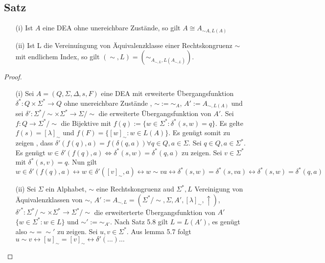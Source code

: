\subsection{Satz}
\begin{itemize}
  \item [(i)] Ist $A$ eine DEA ohne unereichbare Zustände, so gilt $A \cong A_{\sim A, L(A)}$
  \item [(ii)] Ist L die Vereinuíngung von Äquivalenzklasse einer Rechtskongruenz $\sim$ mit endlichem Index, so gilt $(\sim, L) = (\sim_{A_{\sim, L}, L(A_{\sim, L})})$.
\end{itemize}

\begin{proof}
  \begin{itemize}
    \item [(i)] Sei $A = (Q, \Sigma, \Delta, s, F)$ eine DEA mit erweiterte Übergangsfunktion $\delta^* : Q \times \Sigma^* \to Q$ ohne unereichbare Zustände , $\sim := \sim_A$, $A' := A_{\sim, L(A)}$ und sei $\delta' : \Sigma^* / \sim \times \Sigma^* \to \Sigma/\sim$ die erweiterte Übergangsfunktion von $A'$. Sei $f : Q \to \Sigma^* / \sim$ die Bijektive mit $f(q) := \{ w \in \Sigma^* : \delta^*(s,w) = q\}$. Es gelte $f(s) = [\lambda]_{\sim}$ und $f(F) = \{[w]_{\sim} : w \in L(A)\}$. Es genügt somit zu zeigen , dass $\delta'(f(q), a) = f(\delta(q,a)) \forall q \in Q, a \in \Sigma$. Sei $q \in Q, a \in \Sigma^*$. Es genügt $w \in \delta' (f(q), a) \Leftrightarrow \delta^*(s,w) = \delta^*(q, a)$ zu zeigen. Sei $v \in \Sigma^*$ mit $\delta^*(s,v) = q$. Nun gilt $w \in \delta'(f(q), a) \leftrightarrow w \in \delta'([v]_{\sim}, a) \leftrightarrow w \sim va \leftrightarrow \delta^*(s,w) = \delta^*(s, va) \leftrightarrow \delta^*(s,w) = \delta^*(q,a)$  %
    \item [(ii)] Sei $\Sigma$ ein Alphabet, $\sim$ eine Rechtskongruenz aud $\Sigma^*, L$ Vereinigung von Äquivalenzklassen von $\sim$, $A' := A_{\sim, L} = (\Sigma^*/\sim, \Sigma, A', [\lambda]_{\sim}, \uparrow)$, $\delta'^* : \Sigma^*/\sim \times \Sigma^* \to \Sigma^*/\sim$ die erweiterterte Übergangsfunktion von $A'$ $\{w \in \Sigma^* : w \in L \}$ und $\sim' := \sim_{A'}$. Nach Satz 5.8 gilt $L = L(A')$, es genügt also $\sim = \sim'$ zu zeigen. Sei $u, v \in \Sigma^*$. Aus lemma 5.7 folgt $u \sim v \leftrightarrow 
    [u]_{\sim} = [v]_{\sim} \leftrightarrow \delta'(...)$$\dots$
  \end{itemize}
\end{proof}

